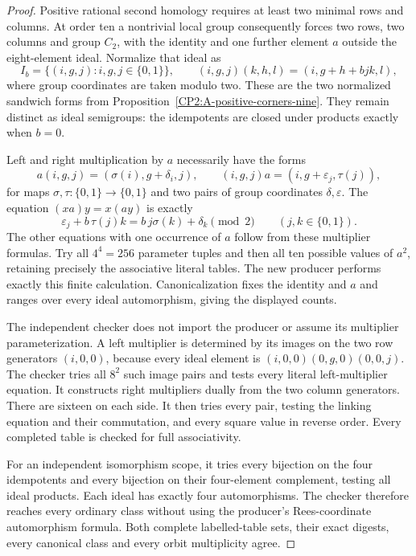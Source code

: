\begin{proof}
Positive rational second homology requires at least two
minimal rows and columns. At order ten a nontrivial local
group consequently forces two rows, two columns and group
$C_2$, with the identity and one further element $a$ outside
the eight-element ideal. Normalize that ideal as
\[
 I_b=\{(i,g,j):i,g,j\in\{0,1\}\},\qquad
 (i,g,j)(k,h,l)=(i,g+h+bjk,l),
\]
where group coordinates are taken modulo two. These are the
two normalized sandwich forms from
Proposition~\ref{CP2:A-positive-corners-nine}.
They remain distinct as ideal semigroups: the idempotents
are closed under products exactly when $b=0$.

Left and right multiplication by $a$ necessarily have the
forms
\[
 a(i,g,j)=(\sigma(i),g+\delta_i,j),\qquad
 (i,g,j)a=(i,g+\varepsilon_j,\tau(j)),
\]
for maps $\sigma,\tau:\{0,1\}\to\{0,1\}$ and two pairs of
group coordinates $\delta,\varepsilon$. The equation
$(x a)y=x(a y)$ is exactly
\[
 \varepsilon_j+b\,\tau(j)k
   =b\,j\sigma(k)+\delta_k\pmod2\qquad(j,k\in\{0,1\}).
\]
The other equations with one occurrence of $a$ follow from
these multiplier formulas. Try all $4^4=256$ parameter
tuples and then all ten possible values of $a^2$, retaining
precisely the associative literal tables. The new producer
 performs exactly this
finite calculation. Canonicalization fixes the identity
and $a$ and ranges over every ideal automorphism, giving the
displayed counts.

The independent checker
 does not import
the producer or assume its multiplier parameterization.
A left multiplier is determined by its images on the two
row generators $(i,0,0)$, because every ideal element is
$(i,0,0)(0,g,0)(0,0,j)$. The checker tries all $8^2$ such
image pairs and tests every literal left-multiplier equation.
It constructs right multipliers dually from the two column
generators. There are sixteen on each side. It then tries
every pair, testing the linking equation and their
commutation, and every square value in reverse order.
Every completed table is checked for full associativity.

For an independent isomorphism scope, it tries every
bijection on the four idempotents and every bijection on
their four-element complement, testing all ideal products.
Each ideal has exactly four automorphisms. The checker
therefore reaches every ordinary class without using the
producer's Rees-coordinate automorphism formula. Both
complete labelled-table sets, their exact digests, every
canonical class and every orbit multiplicity agree.


\end{proof}
